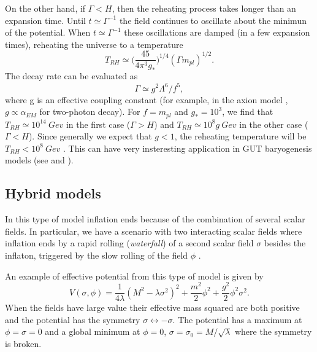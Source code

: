 \documentclass[11pt,a4paper,twoside]{book}
\begin{document}
On the other hand, if $ \Gamma < H $, then the reheating process takes longer than an expansion time. Until $ t \simeq \Gamma^{-1} $ the field continues to oscillate about the minimun of the potential. When $ t \simeq \Gamma^{-1} $ these oscillations are damped (in a few expansion times), reheating the universe to a temperature
\begin{equation}
	T_{RH} \simeq \Big (\frac{45}{4\pi^{3}g_{*}}\Big)^{1/4}(\Gamma m_{pl})^{1/2}.
\end{equation}
The decay rate can be evaluated as 
\begin{equation}
	\label{Chap2:DecayRate}
	\Gamma \simeq g^{2}\Lambda^{6}/f^{5},
\end{equation}
where g is an effective coupling constant (for example, in the axion model \cite{Chap2:AxionModel}, $ g \propto \alpha_{EM} $ for two-photon decay). For $ f=m_{pl} $ and $ g_{*}=10^{3} $, we find that $ T_{RH} \simeq 10^{14}\ Gev $ in the first case ($ \Gamma > H $) and $ T_{RH} \simeq 10^{8} g\ Gev$ in the other case ($\Gamma < H$). Since generally we expect that $ g < 1 $, the reheating temperature will be $ T_{RH} < 10^{8}\ Gev $ \cite{Chap2:NaturalInflation}.
This can have very insteresting application in GUT baryogenesis models (see \cite{Chap2:NaturalInflation} and \cite{Chap2:NaturalInflation_Turner_Steinhardt}).

\subsection{Hybrid models}
In this type of model  inflation ends because of the combination of several scalar fields. In particular, we have a scenario with two interacting scalar fields where inflation ends by a rapid rolling (\textit{waterfall}) of a second scalar field $\sigma$ besides the inflaton, triggered by the slow rolling of the field $\phi$ \cite{Chap2: Hybrid_Model}.

An example of effective potential from this type of model is given by
\begin{equation}
\label{Chap2:Hybrid model}
	V(\sigma,\phi) = \frac{1}{4\lambda}(M^{2}-\lambda \sigma^{2})^{2} + \frac{m^{2}}{2}\phi^{2} + \frac{g^{2}}{2}\phi^{2}\sigma^{2} .
\end{equation} 
When the fields have large value their effective mass squared are both positive and the potential has the symmetry $ \sigma \leftrightarrow -\sigma $. The potential has a maximum at $\phi = \sigma = 0$ and a global minimum at $\phi = 0$, $\sigma=\sigma_{0}=M/\sqrt{\lambda }$ where the symmetry is broken.
\end{document}

